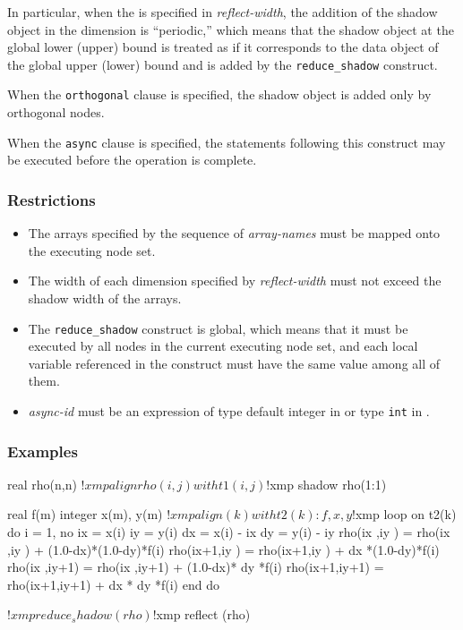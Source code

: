 In particular, when the  is specified in
{\it reflect-width}, the addition of the shadow object in the dimension is
``periodic,'' which means that the shadow object at the global lower
(upper) bound is treated as if it corresponds to the data object of the
global upper (lower) bound and is added by the {\tt reduce\_shadow}
construct.

When the {\tt orthogonal} clause is specified,
the shadow object is added only by orthogonal nodes.

When the {\tt async} clause is specified, the statements following this
construct may be executed before the operation is complete.

\subsubsection*{Restrictions}

\begin{itemize}
 \item The arrays specified by the sequence of {\it array-names} must
       be mapped onto the executing node set.
 \item The width of each dimension specified by {\it
       reflect-width} must not exceed the shadow width of the arrays.
 \item The {\tt reduce\_shadow} construct is global, which means that it must be
       executed by all nodes in the current executing node set, and each local
       variable referenced in the construct must have the same value
       among all of them.
 \item {\it async-id} must be an expression of type default integer in
       {\XMPF} or type {\tt int} in {\XMPC}.
\end{itemize}

\subsubsection*{Examples}

\begin{XFexample}
      real rho(n,n)
!$xmp align rho(i,j) with t1(i,j)
!$xmp shadow rho(1:1)

      real f(m)
      integer x(m), y(m)
!$xmp align (k) with t2(k) : f, x, y

!$xmp loop on t2(k)
      do i = 1, no
        ix = x(i)
        iy = y(i)
        dx = x(i) - ix
        dy = y(i) - iy
        rho(ix  ,iy  ) = rho(ix  ,iy  ) + (1.0-dx)*(1.0-dy)*f(i)
        rho(ix+1,iy  ) = rho(ix+1,iy  ) +      dx *(1.0-dy)*f(i)
        rho(ix  ,iy+1) = rho(ix  ,iy+1) + (1.0-dx)*     dy *f(i)
        rho(ix+1,iy+1) = rho(ix+1,iy+1) +      dx *     dy *f(i)
      end do

!$xmp reduce_shadow (rho)
!$xmp reflect (rho)
\end{XFexample}

